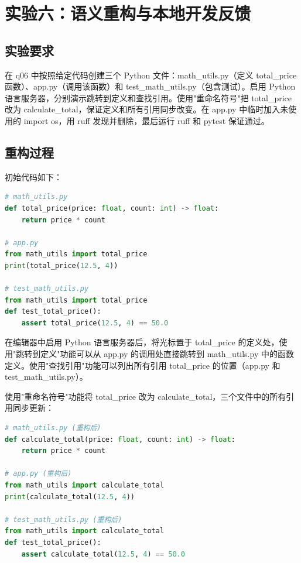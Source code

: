 \documentclass[UTF8]{ctexart}
\begin{document}
\section{实验六：语义重构与本地开发反馈}

\subsection{实验要求}

在 q06 中按照给定代码创建三个 Python 文件：math\_utils.py（定义 total\_price 函数）、app.py（调用该函数）和 test\_math\_utils.py（包含测试）。启用 Python 语言服务器，分别演示跳转到定义和查找引用。使用"重命名符号"把 total\_price 改为 calculate\_total，保证定义和所有引用同步改变。在 app.py 中临时加入未使用的 import os，用 ruff 发现并删除，最后运行 ruff 和 pytest 保证通过。

\subsection{重构过程}

初始代码如下：

\begin{lstlisting}[language=Python]
# math_utils.py
def total_price(price: float, count: int) -> float:
    return price * count

# app.py
from math_utils import total_price
print(total_price(12.5, 4))

# test_math_utils.py
from math_utils import total_price
def test_total_price():
    assert total_price(12.5, 4) == 50.0
\end{lstlisting}

在编辑器中启用 Python 语言服务器后，将光标置于 total\_price 的定义处，使用"跳转到定义"功能可以从 app.py 的调用处直接跳转到 math\_utils.py 中的函数定义。使用"查找引用"功能可以列出所有引用 total\_price 的位置（app.py 和 test\_math\_utils.py）。

使用"重命名符号"功能将 total\_price 改为 calculate\_total，三个文件中的所有引用同步更新：

\begin{lstlisting}[language=Python]
# math_utils.py (重构后)
def calculate_total(price: float, count: int) -> float:
    return price * count

# app.py (重构后)
from math_utils import calculate_total
print(calculate_total(12.5, 4))

# test_math_utils.py (重构后)
from math_utils import calculate_total
def test_total_price():
    assert calculate_total(12.5, 4) == 50.0
\end{lstlisting}
\end{document}
